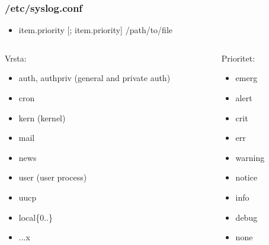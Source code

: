 \documentclass[t,table,usenames,dvipsnames]{beamer}
\begin{document}
\begin{frame}
    \frametitle{/etc/syslog.conf}
    \begin{itemize}
        \item item.priority [; item.priority]   /path/to/file
    \end{itemize}

    \begin{columns}
        \begin{column}{0.5\textwidth}
           Vrsta: \\
            \begin{itemize}
                \item auth, authpriv (general and private auth)
                \item cron
                \item kern (kernel)
                \item mail
                \item news
                \item user (user process)
                \item uucp
                \item local\{0..\}
                \item ...x
            \end{itemize}
        \end{column}
        \begin{column}{0.5\textwidth}  %
            Prioritet: \\
            \begin{itemize}
                \item emerg
                \item alert
                \item crit
                \item err
                \item warning
                \item notice
                \item info
                \item debug
                \item none
            \end{itemize}
        \end{column}
        \end{columns}

\end{frame}
\end{document}
